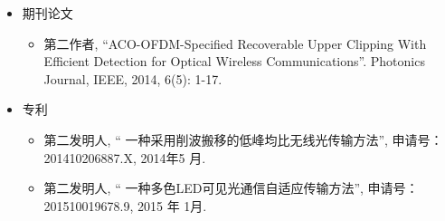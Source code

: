 
\begin{Resume}
    \begin{itemize}
        \item 期刊论文
            \begin{itemize}
                \item 第二作者, ``ACO-OFDM-Specified Recoverable Upper Clipping With Efficient Detection for Optical Wireless Communications''.  Photonics Journal, IEEE, 2014, 6(5): 1-17.
            \end{itemize}
        \item 专利
            \begin{itemize}
                \item 第二发明人, `` 一种采用削波搬移的低峰均比无线光传输方法'', 申请号：201410206887.X, 2014年5 月.
            \end{itemize}
            \begin{itemize}
                \item 第二发明人, `` 一种多色LED可见光通信自适应传输方法'', 申请号：201510019678.9, 2015 年 1月.
            \end{itemize}
    \end{itemize}
\end{Resume}
